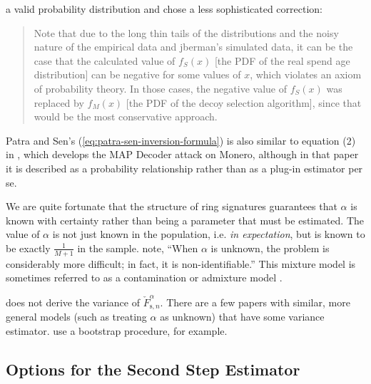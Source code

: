 \documentclass[english]{article}
\begin{document}
a valid probability distribution and chose a less sophisticated correction:
\begin{quote}
Note that due to the long thin tails of the distributions and the
noisy nature of the empirical data and jberman's simulated data, it
can be the case that the calculated value of $f_{S}(x)$ {[}the PDF
of the real spend age distribution{]} can be negative for some values
of $x$, which violates an axiom of probability theory. In those cases,
the negative value of $f_{S}(x)$ was replaced by $f_{M}(x)$ {[}the
PDF of the decoy selection algorithm{]}, since that would be the most
conservative approach.
\end{quote}
Patra and Sen's (\ref{eq:patra-sen-inversion-formula}) is also similar
to equation (2) in \cite{Aeeneh2021}, which develops the MAP Decoder
attack on Monero, although in that paper it is described as a probability
relationship rather than as a plug-in estimator per se.

We are quite fortunate that the structure of ring signatures guarantees
that $\alpha$ is known with certainty rather than being a parameter
that must be estimated. The value of $\alpha$ is not just known in
the population, i.e. \textit{in expectation}, but is known to be exactly
$\tfrac{1}{M+1}$ in the sample. \cite{Patra2016} note, ``When $\alpha$
is unknown, the problem is considerably more difficult; in fact, it
is non-identifiable.'' This mixture model is sometimes referred to
as a contamination or admixture model \cite{milhaud:hal-03201760}.

\cite{Patra2016} does not derive the variance of $\check{F}_{\mathrm{s},n}^{\alpha}$.
There are a few papers with similar, more general models (such as
treating $\alpha$ as unknown) that have some variance estimator.
\cite{AriasCastro2021} use a bootstrap procedure, for example.

\subsection{Options for the Second Step Estimator\label{subsec:Options-for-the-Second-Step-Estimator}}
\end{document}
